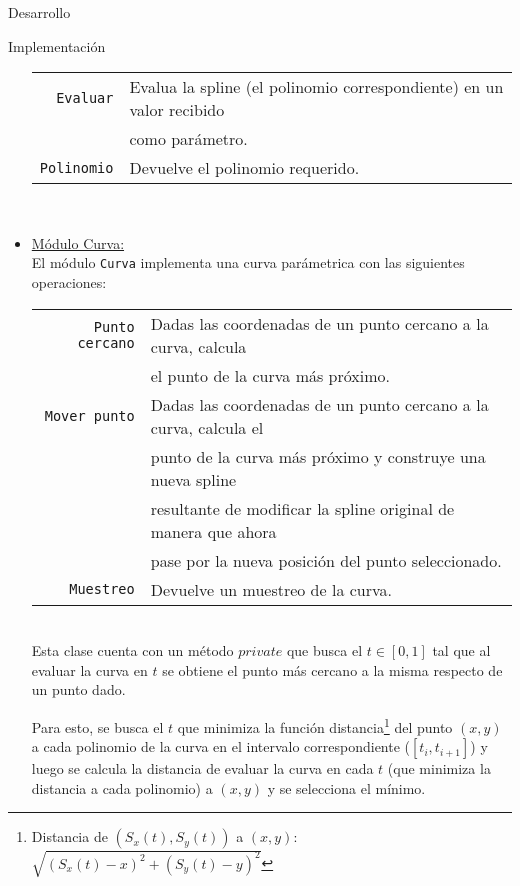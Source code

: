 \begin{section}{Desarrollo}
\begin{subsection}{Implementación}
\begin{itemize}
				\begin{tabular}{rl}
					\texttt{Evaluar} & Evalua la spline (el polinomio correspondiente) en un valor recibido\\
									 & como parámetro.\\
					\texttt{Polinomio} & Devuelve el polinomio requerido.\\
				\end{tabular}\\

			\item \underline{Módulo Curva:}\\
				El módulo \texttt{Curva} implementa una curva parámetrica con las siguientes operaciones:\\
				
				\begin{tabular}{rl}
					\texttt{Punto cercano} & Dadas las coordenadas de un punto cercano a la curva, calcula\\
										   & el punto de la curva más próximo.\\
					\texttt{Mover punto} & Dadas las coordenadas de un punto cercano a la curva, calcula el\\
										 & punto de la curva más próximo y construye una nueva spline\\
										 & resultante de modificar la spline original de manera que ahora\\
										 & pase por la nueva posición del punto seleccionado.\\
					\texttt{Muestreo} & Devuelve un muestreo de la curva.\\
				\end{tabular}\\
				
				Esta clase cuenta con un método $private$ que busca el $t \in [0,1]$ tal que al evaluar la curva en $t$ se obtiene el punto más cercano a la 
				misma respecto de un punto dado.
				
				Para esto, se busca el $t$ que minimiza la función distancia\footnote{Distancia de $(S_x(t),S_y(t))$ a $(x,y)$: $\sqrt{(S_x(t)-x)^2+(S_y(t)-y)^2}$} 
				del punto $(x,y)$ a cada polinomio de la curva en el intervalo correspondiente ($[t_i,t_{i+1}]$) y luego se calcula la distancia de evaluar la curva en cada $t$ 
				(que minimiza la distancia a cada polinomio) a $(x,y)$ y se selecciona el mínimo.
				
				
				
		\end{itemize}
	\end{subsection}
\end{section}
